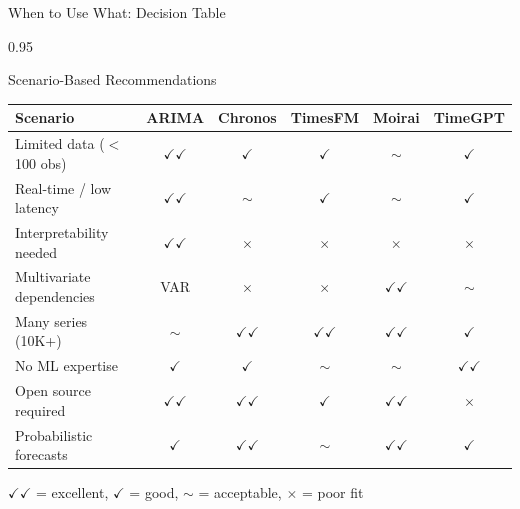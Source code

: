 \documentclass[9pt, aspectratio=169, t]{beamer}
\begin{document}
\begin{frame}{When to Use What: Decision Table}
    \begin{cminipage}{0.95\textwidth}
    \vspace{-3mm}
    {\scriptsize
    \begin{block}{Scenario-Based Recommendations}
    \vspace{-2mm}
    \begin{center}
    \begin{tabular}{l|c|c|c|c|c}
        \toprule
        \textbf{Scenario} & \textbf{ARIMA} & \textbf{Chronos} & \textbf{TimesFM} & \textbf{Moirai} & \textbf{TimeGPT} \\
        \midrule
        Limited data ($<$100 obs) & $\checkmark\checkmark$ & $\checkmark$ & $\checkmark$ & $\sim$ & $\checkmark$ \\
        Real-time / low latency & $\checkmark\checkmark$ & $\sim$ & $\checkmark$ & $\sim$ & $\checkmark$ \\
        Interpretability needed & $\checkmark\checkmark$ & $\times$ & $\times$ & $\times$ & $\times$ \\
        Multivariate dependencies & VAR & $\times$ & $\times$ & $\checkmark\checkmark$ & $\sim$ \\
        Many series (10K+) & $\sim$ & $\checkmark\checkmark$ & $\checkmark\checkmark$ & $\checkmark\checkmark$ & $\checkmark$ \\
        No ML expertise & $\checkmark$ & $\checkmark$ & $\sim$ & $\sim$ & $\checkmark\checkmark$ \\
        Open source required & $\checkmark\checkmark$ & $\checkmark\checkmark$ & $\checkmark$ & $\checkmark\checkmark$ & $\times$ \\
        Probabilistic forecasts & $\checkmark$ & $\checkmark\checkmark$ & $\sim$ & $\checkmark\checkmark$ & $\checkmark$ \\
        \bottomrule
    \end{tabular}
    \end{center}
    \vspace{-2mm}
    {\scriptsize $\checkmark\checkmark$ = excellent, $\checkmark$ = good, $\sim$ = acceptable, $\times$ = poor fit}
    \end{block}
    }
    \end{cminipage}
\end{frame}
\end{document}
